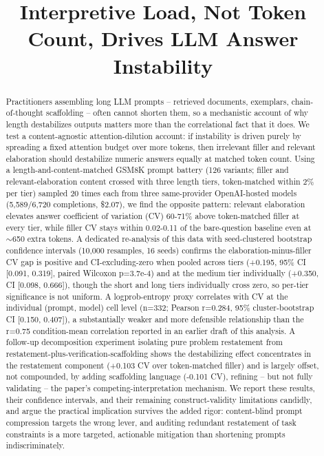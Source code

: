 \documentclass[11pt,letterpaper]{article}
\title{Interpretive Load, Not Token Count, Drives LLM Answer Instability}
\author{}
\date{}
\begin{document}
\maketitle

\begin{abstract}
Practitioners assembling long LLM prompts -- retrieved documents, exemplars, chain-of-thought scaffolding -- often cannot shorten them, so a mechanistic account of why length destabilizes outputs matters more than the correlational fact that it does. We test a content-agnostic attention-dilution account: if instability is driven purely by spreading a fixed attention budget over more tokens, then irrelevant filler and relevant elaboration should destabilize numeric answers equally at matched token count. Using a length-and-content-matched GSM8K prompt battery (126 variants; filler and relevant-elaboration content crossed with three length tiers, token-matched within 2\% per tier) sampled 20 times each from three same-provider OpenAI-hosted models (5,589/6,720 completions, \$2.07), we find the opposite pattern: relevant elaboration elevates answer coefficient of variation (CV) 60-71\% above token-matched filler at every tier, while filler CV stays within 0.02-0.11 of the bare-question baseline even at $\sim$650 extra tokens. A dedicated re-analysis of this data with seed-clustered bootstrap confidence intervals (10,000 resamples, 16 seeds) confirms the elaboration-minus-filler CV gap is positive and CI-excluding-zero when pooled across tiers (+0.195, 95\% CI [0.091, 0.319], paired Wilcoxon p=3.7e-4) and at the medium tier individually (+0.350, CI [0.098, 0.666]), though the short and long tiers individually cross zero, so per-tier significance is not uniform. A logprob-entropy proxy correlates with CV at the individual (prompt, model) cell level (n=332; Pearson r=0.284, 95\% cluster-bootstrap CI [0.150, 0.407]), a substantially weaker and more defensible relationship than the r=0.75 condition-mean correlation reported in an earlier draft of this analysis. A follow-up decomposition experiment isolating pure problem restatement from restatement-plus-verification-scaffolding shows the destabilizing effect concentrates in the restatement component (+0.103 CV over token-matched filler) and is largely offset, not compounded, by adding scaffolding language (-0.101 CV), refining -- but not fully validating -- the paper's competing-interpretation mechanism. We report these results, their confidence intervals, and their remaining construct-validity limitations candidly, and argue the practical implication survives the added rigor: content-blind prompt compression targets the wrong lever, and auditing redundant restatement of task constraints is a more targeted, actionable mitigation than shortening prompts indiscriminately.
\end{abstract}
\end{document}
